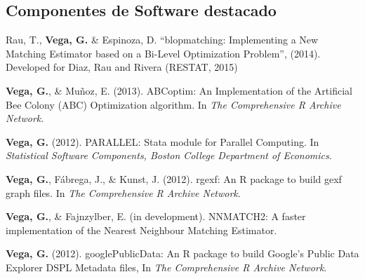 \documentclass[letterpaper, 11pt]{article}
\renewenvironment{itemize}{
  \begin{list}{}{
    \setlength{\leftmargin}{0.45cm}
  }
}{
  \end{list}
}
\begin{document}
\subsection*{Componentes de Software destacado}
\begin{itemize}
\item Rau, T., {\bf Vega, G.} \& Espinoza, D. ``blopmatching: Implementing a New Matching Estimator based on a Bi-Level Optimization Problem'', (2014). Developed for Diaz, Rau and Rivera (RESTAT, 2015)
\item {\bf Vega, G.}, \& Mu\~noz, E. (2013). ABCoptim: An Implementation of the Artificial Bee Colony (ABC) Optimization algorithm. In {\it The Comprehensive R Archive Network}.
\item {\bf Vega, G.} (2012). PARALLEL: Stata module for Parallel Computing. In {\it Statistical Software Components, Boston College Department of Economics}.
\item {\bf Vega, G.}, F\'abrega, J., \& Kunst, J. (2012). rgexf: An R package to build gexf graph files. In {\it The Comprehensive R Archive Network}.
\item {\bf Vega, G.}, \& Fajnzylber, E. (in development). NNMATCH2: A faster implementation of the Nearest Neighbour Matching Estimator.
\item {\bf Vega, G.} (2012). googlePublicData: An R package to build Google's Public Data Explorer DSPL Metadata files, In {\it The Comprehensive R Archive Network}.
\end{itemize}

%
\end{document}
